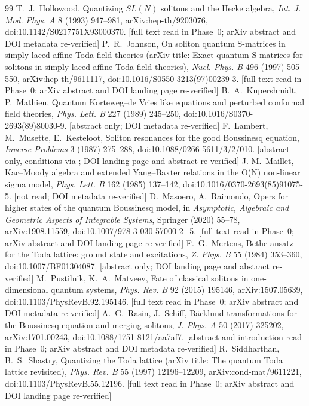 \documentclass[11pt,a4paper]{article}
\theoremstyle{remark}
\begin{document}
\begin{thebibliography}{99}
 T.~J.~Hollowood, Quantizing $SL(N)$ solitons and the Hecke algebra, \emph{Int. J. Mod. Phys. A} 8 (1993) 947--981, arXiv:hep-th/9203076, doi:10.1142/S0217751X93000370. [full text read in Phase~0; arXiv abstract and DOI metadata re-verified]
 P.~R.~Johnson, On soliton quantum S-matrices in simply laced affine Toda field theories (arXiv title: Exact quantum S-matrices for solitons in simply-laced affine Toda field theories), \emph{Nucl. Phys. B} 496 (1997) 505--550, arXiv:hep-th/9611117, doi:10.1016/S0550-3213(97)00239-3. [full text read in Phase~0; arXiv abstract and DOI landing page re-verified]
 B.~A.~Kupershmidt, P.~Mathieu, Quantum Korteweg--de Vries like equations and perturbed conformal field theories, \emph{Phys. Lett. B} 227 (1989) 245--250, doi:10.1016/S0370-2693(89)80030-9. [abstract only; DOI metadata re-verified]
 F.~Lambert, M.~Musette, E.~Kesteloot, Soliton resonances for the good Boussinesq equation, \emph{Inverse Problems} 3 (1987) 275--288, doi:10.1088/0266-5611/3/2/010. [abstract only, conditions via \cite{BD}; DOI landing page and abstract re-verified]
 J.-M.~Maillet, Kac--Moody algebra and extended Yang--Baxter relations in the O(N) non-linear sigma model, \emph{Phys. Lett. B} 162 (1985) 137--142, doi:10.1016/0370-2693(85)91075-5. [not read; DOI metadata re-verified]
 D.~Masoero, A.~Raimondo, Opers for higher states of the quantum Boussinesq model, in \emph{Asymptotic, Algebraic and Geometric Aspects of Integrable Systems}, Springer (2020) 55--78, arXiv:1908.11559, doi:10.1007/978-3-030-57000-2\_5. [full text read in Phase~0; arXiv abstract and DOI landing page re-verified]
 F.~G.~Mertens, Bethe ansatz for the Toda lattice: ground state and excitations, \emph{Z. Phys. B} 55 (1984) 353--360, doi:10.1007/BF01304087. [abstract only; DOI landing page and abstract re-verified]
 M.~Pustilnik, K.~A.~Matveev, Fate of classical solitons in one-dimensional quantum systems, \emph{Phys. Rev. B} 92 (2015) 195146, arXiv:1507.05639, doi:10.1103/PhysRevB.92.195146. [full text read in Phase~0; arXiv abstract and DOI metadata re-verified]
 A.~G.~Rasin, J.~Schiff, B\"acklund transformations for the Boussinesq equation and merging solitons, \emph{J. Phys. A} 50 (2017) 325202, arXiv:1701.00243, doi:10.1088/1751-8121/aa7af7. [abstract and introduction read in Phase~0; arXiv abstract and DOI metadata re-verified]
 R.~Siddharthan, B.~S.~Shastry, Quantizing the Toda lattice (arXiv title: The quantum Toda lattice revisited), \emph{Phys. Rev. B} 55 (1997) 12196--12209, arXiv:cond-mat/9611221, doi:10.1103/PhysRevB.55.12196. [full text read in Phase~0; arXiv abstract and DOI landing page re-verified]

\end{thebibliography}
\end{document}
